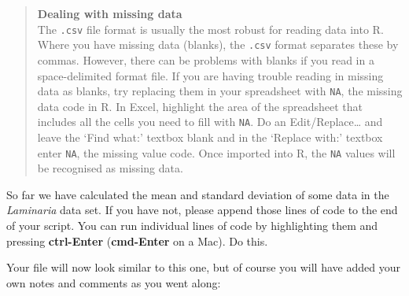 \documentclass[]{book}
\theoremstyle{definition}
\theoremstyle{definition}
\theoremstyle{definition}
\theoremstyle{remark}
\begin{document}
\begin{quote}
\textbf{Dealing with missing data}\\
The \texttt{.csv} file format is usually the most robust for reading
data into R. Where you have missing data (blanks), the \texttt{.csv}
format separates these by commas. However, there can be problems with
blanks if you read in a space-delimited format file. If you are having
trouble reading in missing data as blanks, try replacing them in your
spreadsheet with \texttt{NA}, the missing data code in R. In Excel,
highlight the area of the spreadsheet that includes all the cells you
need to fill with \texttt{NA}. Do an Edit/Replace\ldots{} and leave the
`Find what:' textbox blank and in the `Replace with:' textbox enter
\texttt{NA}, the missing value code. Once imported into R, the
\texttt{NA} values will be recognised as missing data.
\end{quote}

So far we have calculated the mean and standard deviation of some data
in the \emph{Laminaria} data set. If you have not, please append those
lines of code to the end of your script. You can run individual lines of
code by highlighting them and pressing \textbf{ctrl-Enter}
(\textbf{cmd-Enter} on a Mac). Do this.

Your file will now look similar to this one, but of course you will have
added your own notes and comments as you went along:
\end{document}

